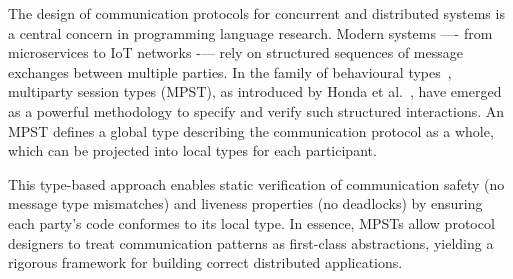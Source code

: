 
The design of communication protocols for concurrent and distributed systems is a central concern in programming language research. 
Modern systems —- from microservices to IoT networks -— rely on structured sequences of message exchanges between multiple parties. 
In the family of behavioural types~\cite{DBLP:conf/concur/VasconcelosH93}, multiparty session types (MPST), as introduced by Honda et al.~\cite{HondaYC08,10.1145/2873052,DBLP:conf/icdcit/YoshidaG20}, have emerged as a powerful methodology to specify and verify such structured interactions. 
An MPST defines a global type describing the communication protocol as a whole, which can be projected into local types for each participant.%

This type-based approach enables static verification of communication safety (no message type mismatches) and liveness properties (no deadlocks) by ensuring each party's code conformes to its local type. 
In essence, MPSTs allow protocol designers to treat communication patterns as first-class abstractions, yielding a rigorous framework for building correct distributed applications. 

